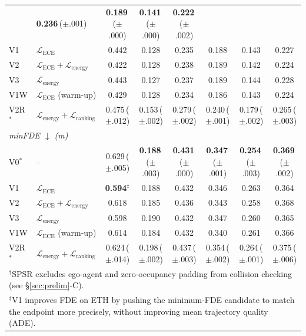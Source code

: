 \documentclass[journal]{IEEEtran}
\begin{document}
\begin{table}[t]
\begin{tabular}{l l c c c c c c}
  & \textbf{0.236}\,\scriptsize{({\tiny$\pm$.001})}
  & \textbf{0.189}\,\scriptsize{({\tiny$\pm$.000})}
  & \textbf{0.141}\,\scriptsize{({\tiny$\pm$.000})}
  & \textbf{0.222}\,\scriptsize{({\tiny$\pm$.002})} \\
V1   & $\mathcal{L}_\text{ECE}$
  & 0.442 & 0.128 & 0.235 & 0.188 & 0.143 & 0.227 \\
V2   & $\mathcal{L}_\text{ECE}{+}\mathcal{L}_\text{energy}$
  & 0.422 & 0.128 & 0.238 & 0.189 & 0.142 & 0.224 \\
V3   & $\mathcal{L}_\text{energy}$
  & 0.443 & 0.127 & 0.237 & 0.189 & 0.144 & 0.228 \\
V1W  & $\mathcal{L}_\text{ECE}$ (warm-up)
  & 0.429 & 0.128 & 0.234 & 0.186 & 0.143 & 0.224 \\
V2R$^*$ & $\mathcal{L}_\text{energy}{+}\mathcal{L}_\text{ranking}$
  & 0.475\,\scriptsize{({\tiny$\pm$.012})}
  & 0.153\,\scriptsize{({\tiny$\pm$.002})}
  & 0.279\,\scriptsize{({\tiny$\pm$.002})}
  & 0.240\,\scriptsize{({\tiny$\pm$.001})}
  & 0.179\,\scriptsize{({\tiny$\pm$.002})}
  & 0.265\,\scriptsize{({\tiny$\pm$.003})} \\
\midrule
\multicolumn{8}{l}{\textit{minFDE $\downarrow$ (m)}} \\[1pt]
V0$^*$  & --
  & 0.629\,\scriptsize{({\tiny$\pm$.005})}
  & \textbf{0.188}\,\scriptsize{({\tiny$\pm$.003})}
  & \textbf{0.431}\,\scriptsize{({\tiny$\pm$.000})}
  & \textbf{0.347}\,\scriptsize{({\tiny$\pm$.001})}
  & \textbf{0.254}\,\scriptsize{({\tiny$\pm$.003})}
  & \textbf{0.369}\,\scriptsize{({\tiny$\pm$.002})} \\
V1   & $\mathcal{L}_\text{ECE}$
  & \textbf{0.594}$^\ddagger$
  & 0.188 & 0.432 & 0.346 & 0.263 & 0.364 \\
V2   & $\mathcal{L}_\text{ECE}{+}\mathcal{L}_\text{energy}$
  & 0.618 & 0.185 & 0.436 & 0.343 & 0.258 & 0.368 \\
V3   & $\mathcal{L}_\text{energy}$
  & 0.598 & 0.190 & 0.432 & 0.347 & 0.260 & 0.365 \\
V1W  & $\mathcal{L}_\text{ECE}$ (warm-up)
  & 0.614 & 0.184 & 0.432 & 0.340 & 0.261 & 0.366 \\
V2R$^*$ & $\mathcal{L}_\text{energy}{+}\mathcal{L}_\text{ranking}$
  & 0.624\,\scriptsize{({\tiny$\pm$.014})}
  & 0.198\,\scriptsize{({\tiny$\pm$.002})}
  & 0.437\,\scriptsize{({\tiny$\pm$.003})}
  & 0.354\,\scriptsize{({\tiny$\pm$.002})}
  & 0.264\,\scriptsize{({\tiny$\pm$.001})}
  & 0.375\,\scriptsize{({\tiny$\pm$.006})} \\
\bottomrule
\multicolumn{8}{l}{{\scriptsize
  $^\dagger$SPSR excludes ego-agent and zero-occupancy padding from
  collision checking (see \S\ref{sec:prelim}-C).}} \\
\multicolumn{8}{l}{{\scriptsize
  $^\ddagger$V1 improves FDE on ETH by pushing the minimum-FDE candidate
  to match the endpoint more precisely, without improving mean trajectory
  quality (ADE).}} \\
\end{tabular}
\end{table}
\end{document}
